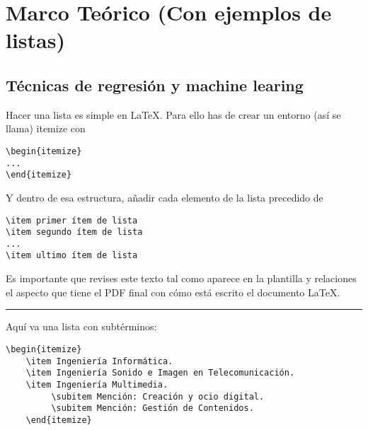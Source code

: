 
\chapter{Marco Teórico (Con ejemplos de listas)}
\label{marcoteorico}

\section{Técnicas de regresión y machine learing}
Hacer una lista es simple en \LaTeX. Para ello has de crear un entorno (así se llama) itemize con
\begin{lstlisting}[style=Latex-color]
\begin{itemize}
...
\end{itemize}
\end{lstlisting}
Y dentro de esa estructura, añadir cada elemento de la lista precedido de 
\begin{lstlisting}[style=Latex-color]
\item primer ítem de lista
\item segundo ítem de lista
...
\item ultimo ítem de lista
\end{lstlisting}

Es importante que revises este texto tal como aparece en la plantilla y relaciones el aspecto que tiene el PDF final con cómo está escrito el documento \LaTeX.
\vspace{1em}
\noindent\hrule
\vspace{1em}

Aquí va una lista con subtérminos:
\begin{lstlisting}[style=Latex-color]
	\begin{itemize}
    \item Ingeniería Informática.
    \item Ingeniería Sonido e Imagen en Telecomunicación.
    \item Ingeniería Multimedia.
         \subitem Mención: Creación y ocio digital.
         \subitem Mención: Gestión de Contenidos.
	\end{itemize}
\end{lstlisting}

